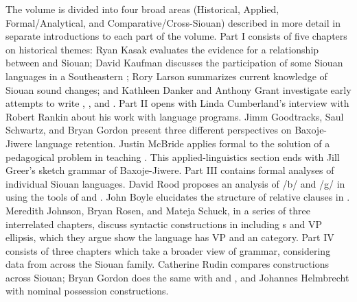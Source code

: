 \begin{refsection}
The volume is divided into four broad areas (Historical, Applied, Formal/Analy\-tical, and Comparative/Cross-Siouan) described in more detail in separate introductions to each part of the volume. Part I consists of five chapters on historical themes: Ryan Kasak evaluates the evidence for a relationship between  and Siouan; David Kaufman discusses the participation of some Siouan languages in a Southeastern ; Rory Larson summarizes current knowledge of Siouan sound changes; and Kathleen Danker and Anthony Grant investigate early attempts to write , , and .  Part II opens with Linda Cumberland's interview with Robert Rankin about his work with  language programs. Jimm Goodtracks, Saul Schwartz, and Bryan Gordon present three different perspectives on Baxoje-Jiwere language retention. Justin McBride applies formal  to the solution of a pedagogical problem in teaching . This applied-linguistics section ends with Jill Greer's sketch grammar of Baxoje-Jiwere. Part III contains formal analyses of individual Siouan languages. David Rood proposes an analysis of /b/ and /g/ in  using the tools of  and . John Boyle elucidates the structure of relative clauses in . Meredith Johnson, Bryan Rosen, and Mateja Schuck, in a series of three interrelated chapters, discuss syntactic constructions in  including s and VP ellipsis, which they argue show the language has VP and an  category. Part IV consists of three chapters which take a broader view of grammar, considering data from across the Siouan family. Catherine Rudin compares  constructions across Siouan; Bryan Gordon does the same with  and , and Johannes Helmbrecht with nominal possession constructions. 
 


\end{refsection}
